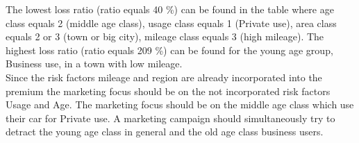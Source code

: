 \documentclass[11pt]{article}
\begin{document}
The lowest loss ratio (ratio equals 40 \%) can be found in the table where age class equals 2 (middle age class), usage class equals 1 (Private use), area class equals 2 or 3 (town or big city), mileage class equals 3 (high mileage). The highest loss ratio (ratio equals 209 \%) can be found for the young age group, Business use, in a town with low mileage. \\

Since the risk factors mileage and region are already incorporated into the premium the marketing focus should be on the not incorporated risk factors Usage and Age. The marketing focus should be on the middle age class which use their car for Private use. A marketing campaign should simultaneously try to detract the young age class in general and the old age class business users. 
\end{document}
